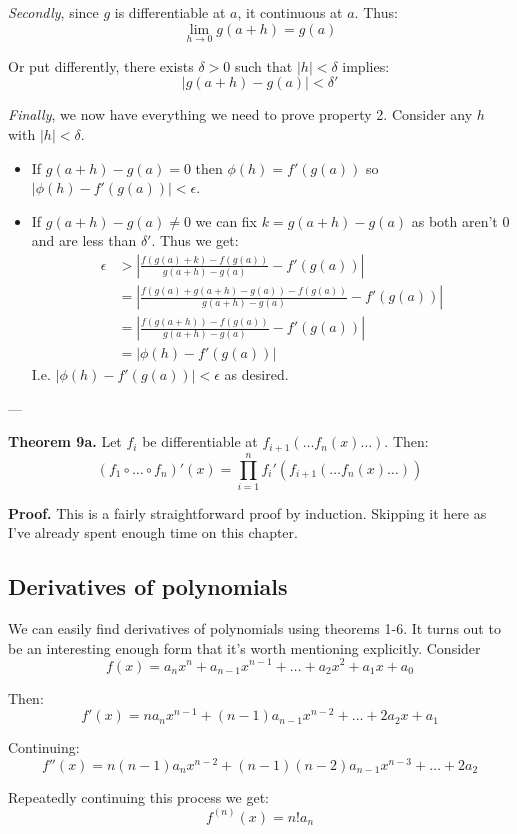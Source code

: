 \textit{Secondly}, since $g$ is differentiable at $a$, it continuous
at $a$. Thus:
\[\lim_{h\to0}g(a+h)=g(a)\]

Or put differently, there exists $\delta>0$ such that $|h|<\delta$ implies:
\[|g(a+h)-g(a)|<\delta'\]

\textit{Finally}, we now have everything we need to prove property 2.
Consider any $h$ with $|h|<\delta$.
\begin{itemize}
\item If $g(a+h)-g(a)=0$ then $\phi(h)=f'(g(a))$ so $|\phi(h)-f'(g(a))|<\epsilon$.
\item If $g(a+h)-g(a)\neq0$ we can fix $k=g(a+h)-g(a)$ as both aren't
  $0$ and are less than $\delta'$. Thus we get:
\begin{align*}
  \epsilon&>\left|\frac{f(g(a)+k)-f(g(a))}{g(a+h)-g(a)}-f'(g(a))\right|\\
  &=\left|\frac{f(g(a)+g(a+h)-g(a))-f(g(a))}{g(a+h)-g(a)}-f'(g(a))\right|\\
  &=\left|\frac{f(g(a+h))-f(g(a))}{g(a+h)-g(a)}-f'(g(a))\right|\\
  &=\left|\phi(h)-f'(g(a))\right|
\end{align*}
I.e. $\left|\phi(h)-f'(g(a))\right|<\epsilon$ as desired.
\end{itemize}

\vs---\vs

\textbf{Theorem 9a.} Let $f_i$ be differentiable at
$f_{i+1}(\dots f_n(x) \dots)$. Then:
\[(f_1\circ \ldots\circ f_n)'(x) = \prod_{i=1}^{n} f_i' \left( f_{i+1}(\dots f_n(x) \dots) \right)\]

\vs

\textbf{Proof.} This is a fairly straightforward proof by induction.
Skipping it here as I've already spent enough time on this chapter.

\subsection{Derivatives of polynomials}
We can easily find derivatives of polynomials using theorems 1-6. It
turns out to be an interesting enough form that it's worth mentioning
explicitly. Consider
\[f(x)=a_nx^n+a_{n-1}x^{n-1}+\ldots+a_2x^2+a_1x+a_0\]

Then:
\[f'(x)=na_nx^{n-1}+(n-1)a_{n-1}x^{n-2}+\ldots+2a_2x+a_1\]

Continuing:
\[f''(x)=n(n-1)a_nx^{n-2}+(n-1)(n-2)a_{n-1}x^{n-3}+\ldots+2a_2\]

Repeatedly continuing this process we get:
\[f^{(n)}(x)=n!a_n\]

